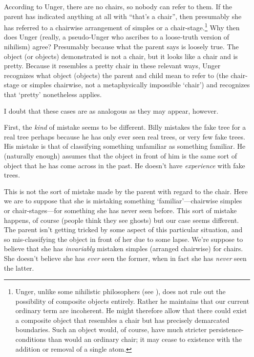 \documentclass[11pt]{standalone} \newif\ifstandlone \standalonetrue
\begin{document}
\begin{spacing}{1.5}
According to Unger, there are no chairs, so nobody can refer to them.
If the parent has indicated anything at all with ``that's a chair'',
then presumably she has referred to a chairwise arrangement of simples
or a chair-stage.\footnote{Unger, unlike some nihilistic philosophers
  (see \citet{Sider2011c}), does not rule out the possibility of
  composite objects entirely.  Rather he maintains that our current
  ordinary term are incoherent.  He might therefore allow that there
  could exist a composite object that resembles a chair but has
  precisely demarcated boundaries.  Such an object would, of course,
  have much stricter persistence-conditions than would an ordinary
  chair; it may cease to existence with the addition or removal of a
  single atom.}  Why then does Unger (really, a pseudo-Unger who
ascribes to a loose-truth version of nihilism) agree?  Presumably
because what the parent says is loosely true.  The object (or objects)
demonstrated is not a chair, but it looks like a chair and is pretty.
Because it resembles a pretty chair in these relevant ways, Unger
recognizes what object (objects) the parent and child mean to refer to
(the chair-stage or simples chairwise, not a metaphysically impossible
`chair') and recognizes that `pretty' nonetheless applies.

I doubt that these cases are as analogous as they may appear, however.

First, the {\em kind} of mistake seems to be different.  Billy
mistakes the fake tree for a real tree perhaps because he has only
ever seen real trees, or very few fake trees.  His mistake is that of
classifying something unfamiliar as something familiar.  He (naturally
enough) assumes that the object in front of him is the same sort of
object that he has come across in the past.  He doesn't have {\em
  experience} with fake trees.

This is not the sort of mistake made by the parent with regard to the
chair.  Here we are to suppose that she is mistaking something
`familiar'---chairwise simples or chair-stages---for something she has
never seen before.  This sort of mistake happens, of course (people
think they see ghosts) but our case seems different.  The parent isn't
getting tricked by some aspect of this particular situation, and so
mis-classifying the object in front of her due to some lapse.  We're
suppose to believe that she has {\em invariably} mistaken simples
(arranged chairwise) for chairs.  She doesn't believe she has {\em
  ever} seen the former, when in fact she has {\em never} seen the
latter.


\end{spacing}
\end{document}

